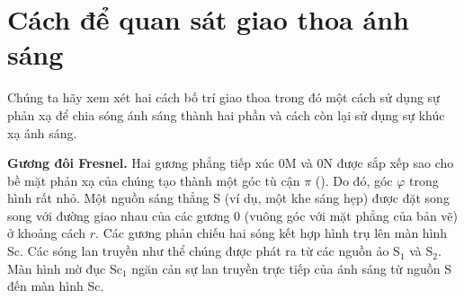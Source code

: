 \section{Cách để quan sát giao thoa ánh sáng}\label{sec:17_3}

Chúng ta hãy xem xét hai cách bố trí giao thoa trong đó một cách sử dụng sự phản xạ để chia sóng ánh sáng thành hai phần và cách còn lại sử dụng sự khúc xạ ánh sáng.

\textbf{Gương đôi Fresnel.}
Hai gương phẳng tiếp xúc $0$M và $0$N được sắp xếp sao cho bề mặt phản xạ của chúng tạo thành một góc tù cận $\pi$ ().
Do đó, góc $\varphi$ trong hình rất nhỏ.
Một nguồn sáng thẳng S (ví dụ, một khe sáng hẹp) được đặt song song với đường giao nhau của các gương $0$ (vuông góc
với mặt phẳng của bản vẽ) ở khoảng cách $r$.
Các gương phản chiếu hai sóng kết hợp hình trụ lên màn hình Sc.
Các sóng lan truyền như thể chúng được phát ra từ các nguồn ảo S$_1$ và S$_2$.
Màn hình mờ đục Sc$_1$ ngăn cản sự lan truyền trực tiếp của ánh sáng từ nguồn S đến màn hình Sc.

